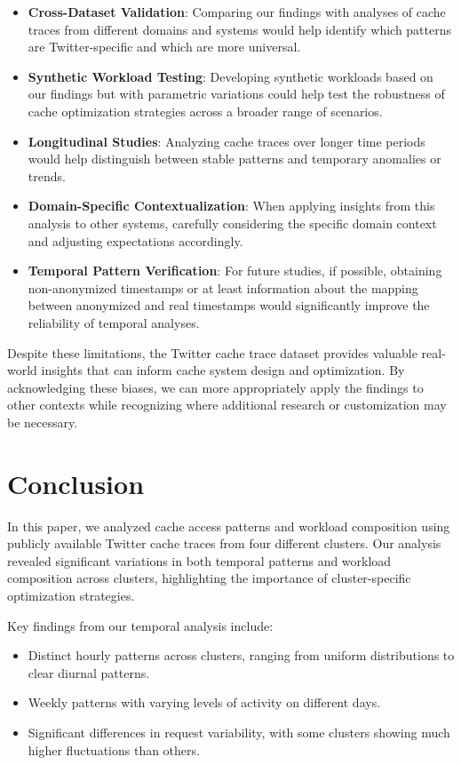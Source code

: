 \documentclass[conference]{IEEEtran}
\begin{document}
\begin{itemize}
    \item \textbf{Cross-Dataset Validation}: Comparing our findings with analyses of cache traces from different domains and systems would help identify which patterns are Twitter-specific and which are more universal.
    
    \item \textbf{Synthetic Workload Testing}: Developing synthetic workloads based on our findings but with parametric variations could help test the robustness of cache optimization strategies across a broader range of scenarios.
    
    \item \textbf{Longitudinal Studies}: Analyzing cache traces over longer time periods would help distinguish between stable patterns and temporary anomalies or trends.
    
    \item \textbf{Domain-Specific Contextualization}: When applying insights from this analysis to other systems, carefully considering the specific domain context and adjusting expectations accordingly.
    
    \item \textbf{Temporal Pattern Verification}: For future studies, if possible, obtaining non-anonymized timestamps or at least information about the mapping between anonymized and real timestamps would significantly improve the reliability of temporal analyses.
\end{itemize}

Despite these limitations, the Twitter cache trace dataset provides valuable real-world insights that can inform cache system design and optimization. By acknowledging these biases, we can more appropriately apply the findings to other contexts while recognizing where additional research or customization may be necessary.

\section{Conclusion}
In this paper, we analyzed cache access patterns and workload composition using publicly available Twitter cache traces from four different clusters. Our analysis revealed significant variations in both temporal patterns and workload composition across clusters, highlighting the importance of cluster-specific optimization strategies.

Key findings from our temporal analysis include:
\begin{itemize}
    \item Distinct hourly patterns across clusters, ranging from uniform distributions to clear diurnal patterns.
    \item Weekly patterns with varying levels of activity on different days.
    \item Significant differences in request variability, with some clusters showing much higher fluctuations than others.
\end{itemize}
\end{document}
